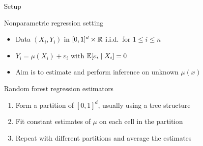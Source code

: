 \documentclass{beamer}
\begin{document}
\begin{frame}{Setup}

  Nonparametric regression setting

  \begin{itemize}
    \item Data $(X_i, Y_i)$ in $[0,1]^d \times \mathbb{R}$
      i.i.d.\ for $1 \leq i \leq n$
    \item $Y_i = \mu(X_i) + \varepsilon_i$
      with $\mathbb{E}[\varepsilon_i \mid X_i] = 0$
    \item Aim is to estimate and perform inference
      on unknown $\mu(x)$
  \end{itemize}

  Random forest regression estimators

  \begin{enumerate}
    \item Form a \alert{partition} of $[0,1]^d$,
      usually using a tree structure
    \item Fit constant estimates of $\mu$ on each cell in the partition
    \item Repeat with different partitions and \alert{average} the estimates
  \end{enumerate}
\end{frame}
\end{document}
